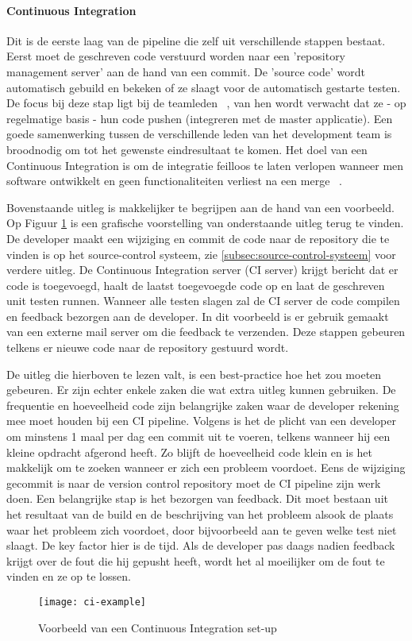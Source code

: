         \paragraph{Continuous Integration}
        Dit is de eerste laag van de pipeline die zelf uit verschillende stappen bestaat. Eerst moet de geschreven code verstuurd worden naar een 'repository management server' aan de hand van een commit. De 'source code' wordt automatisch gebuild en bekeken of ze slaagt voor de automatisch gestarte testen. De focus bij deze stap ligt bij de teamleden ~\autocite{Fowler2006}, van hen wordt verwacht dat ze - op regelmatige basis - hun code pushen (integreren met de master applicatie). Een goede samenwerking tussen de verschillende leden van het development team is broodnodig om tot het gewenste eindresultaat te komen.
        Het doel van een Continuous Integration is om de integratie feilloos te laten verlopen wanneer men software ontwikkelt en geen functionaliteiten verliest na een merge ~\autocite{Riti2018}.
        
        Bovenstaande uitleg is makkelijker te begrijpen aan de hand van een voorbeeld. Op Figuur \ref{img-ci-example} is een grafische voorstelling van onderstaande uitleg terug te vinden.
        De developer maakt een wijziging en commit de code naar de repository die te vinden is op het source-control systeem, zie \ref{subsec:source-control-systeem} voor verdere uitleg. De Continuous Integration server (CI server) krijgt bericht dat er code is toegevoegd, haalt de laatst toegevoegde code op en laat de geschreven unit testen runnen. Wanneer alle testen slagen zal de CI server de code compilen en feedback bezorgen aan de developer. In dit voorbeeld is er gebruik gemaakt van een externe mail server om die feedback te verzenden.
        Deze stappen gebeuren telkens er nieuwe code naar de repository gestuurd wordt.
        
        De uitleg die hierboven te lezen valt, is een best-practice hoe het zou moeten gebeuren. Er zijn echter enkele zaken die wat extra uitleg kunnen gebruiken.
        De frequentie en hoeveelheid code zijn belangrijke zaken waar de developer rekening mee moet houden bij een CI pipeline. Volgens \textcite{Fowler2006} is het de plicht van een developer om minstens 1 maal per dag een commit uit te voeren, telkens wanneer hij een kleine opdracht afgerond heeft. Zo blijft de hoeveelheid code klein en is het makkelijk om te zoeken wanneer er zich een probleem voordoet.
        Eens de wijziging gecommit is naar de version control repository moet de CI pipeline zijn werk doen. Een belangrijke stap is het bezorgen van feedback. Dit moet bestaan uit het resultaat van de build en de beschrijving van het probleem alsook de plaats waar het probleem zich voordoet, door bijvoorbeeld aan te geven welke test niet slaagt. De key factor hier is de tijd. Als de developer pas daags nadien feedback krijgt over de fout die hij gepusht heeft, wordt het al moeilijker om de fout te vinden en ze op te lossen. 
        \begin{figure}	
            \texttt{[image: ci-example]}
            \caption{Voorbeeld van een Continuous Integration set-up ~\autocite{Riti2018}} \label{img-ci-example}
        \end{figure}
    
